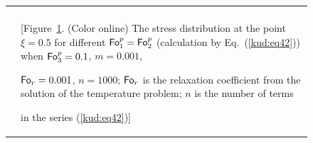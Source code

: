 \begin{figure}[p!]
\begin{tabular}{lp{4.8cm}}
{\label{kud:pic21}}

\\ 

&\vspace{-2.9cm}

[Figure~\ref{kud:pic21}. (Color online)  The stress distribution at the point  $\xi=0.5$ for different $\operatorname{\sf Fo}_1^p =\operatorname{\sf Fo}_2 ^p$ (calculation by Eq.~(\ref{kud:eq42})) when $\operatorname{\sf Fo}_3^p =0.1$, $m=0.001$, 

$\operatorname{\sf Fo}_r=0.001$, $n=1000$; $\operatorname{\sf Fo}_r$ is the relaxation coefficient from the solution of the temperature problem;  $n$ is the number of terms \centerline{in the series (\ref{kud:eq42})]}

\\



\end{tabular}



\end{figure}









